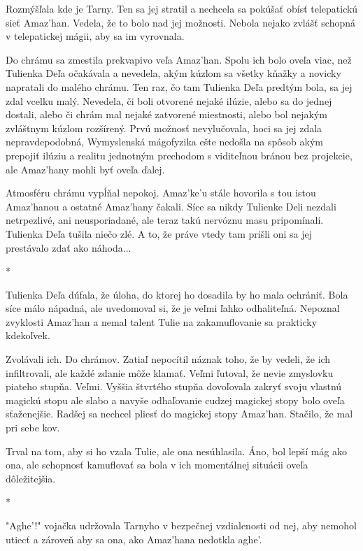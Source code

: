\documentclass{book}
\begin{document}
Rozmýšľala kde je Tarny. Ten sa jej stratil a nechcela sa pokúšať obísť telepatickú sieť Amaz'han. Vedela, že to bolo nad jej možnosti. Nebola nejako zvlášť schopná v telepatickej mágii, aby sa im vyrovnala.

Do chrámu sa zmestila prekvapivo veľa Amaz'han. Spolu ich bolo oveľa viac, než Tulienka Deľa očakávala a nevedela, akým kúzlom sa všetky kňažky a novicky napratali do malého chrámu. Ten raz, čo tam Tulienka Deľa predtým bola, sa jej zdal vcelku malý. Nevedela, či boli otvorené nejaké ilúzie, alebo sa do jednej dostali, alebo či chrám mal nejaké zatvorené miestnosti, alebo bol nejakým zvláštnym kúzlom rozšírený. Prvú možnosť nevylučovala, hoci sa jej zdala nepravdepodobná, Wymyslenská mágofyzika ešte nedošla na spôsob akým prepojiť ilúziu a realitu jednotným prechodom s viditeľnou bránou bez projekcie, ale Amaz'hany mohli byť oveľa ďalej.

Atmosféru chrámu vypĺňal nepokoj. Amaz'ke'u stále hovorila s tou istou Amaz'hanou a ostatné Amaz'hany čakali. Síce sa nikdy Tulienke Deli nezdali netrpezlivé, ani neusporiadané, ale teraz takú nervóznu masu pripomínali. Tulienka Deľa tušila niečo zlé. A to, že práve vtedy tam prišli oni sa jej prestávalo zdať ako náhoda...

\begin{center}
*
\end{center}

Tulienka Deľa dúfala, že úloha, do ktorej ho dosadila by ho mala ochrániť. Bola síce málo nápadná, ale uvedomoval si, že je veľmi ľahko odhaliteľná. Nepoznal zvyklosti Amaz'han a nemal talent Tulie na zakamuflovanie sa prakticky kdekoľvek.

Zvolávali ich. Do chrámov. Zatiaľ nepocítil náznak toho, že by vedeli, že ich infiltrovali, ale každé zdanie môže klamať. Veľmi ľutoval, že nevie zmyslovku piateho stupňa. Veľmi. Vyššia štvrtého stupňa dovoľovala zakryť svoju vlastnú magickú stopu ale slabo a navyše odhaľovanie cudzej magickej stopy bolo oveľa sťaženejšie. Radšej sa nechcel pliesť do magickej stopy Amaz'han. Stačilo, že mal pri sebe kov.

Trval na tom, aby si ho vzala Tulie, ale ona nesúhlasila. Áno, bol lepší mág ako ona, ale schopnosť kamuflovať sa bola v ich momentálnej situácii oveľa dôležitejšia.

\begin{center}
*
\end{center}

"$ $Aghe'!"$ $ vojačka udržovala Tarnyho v bezpečnej vzdialenosti od nej, aby nemohol utiecť a zároveň aby sa ona, ako Amaz'hana nedotkla aghe'.
\end{document}
